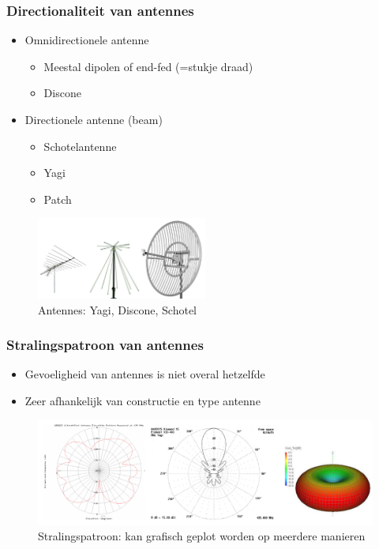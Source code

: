 \documentclass{article}
\begin{document}
\subsubsection{Directionaliteit van antennes}
\begin{itemize}
    \item Omnidirectionele antenne
    \begin{itemize}
        \item Meestal dipolen of end-fed (=stukje draad)
        \item Discone
    \end{itemize}
    \item Directionele antenne (beam)
    \begin{itemize}
        \item Schotelantenne
        \item Yagi
        \item Patch
    \end{itemize}
\end{itemize}

\begin{figure}[H]
    \centering
    \includegraphics[width=0.5\textwidth]{Screenshot_20200309_122609.png}
    \caption{Antennes: Yagi, Discone, Schotel}
\end{figure}

\subsubsection{Stralingspatroon van antennes}
\begin{itemize}
    \item Gevoeligheid van antennes is niet overal hetzelfde
    \item Zeer afhankelijk van constructie en type antenne
\end{itemize}

\begin{figure}[H]
    \centering
    \includegraphics[width=\textwidth]{Screenshot_20200309_122734.png}
    \caption{Stralingspatroon: kan grafisch geplot worden op meerdere manieren}
\end{figure}
\end{document}
